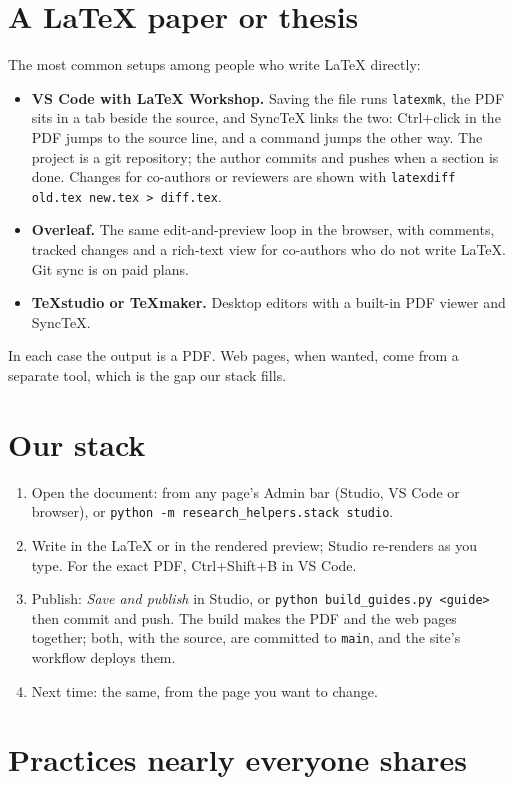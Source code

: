 \section{A LaTeX paper or thesis}

The most common setups among people who write LaTeX directly:
\begin{itemize}
\item \textbf{VS Code with LaTeX Workshop.} Saving the file runs \texttt{latexmk}, the PDF sits in a tab beside the source, and SyncTeX links the two: Ctrl+click in the PDF jumps to the source line, and a command jumps the other way. The project is a git repository; the author commits and pushes when a section is done. Changes for co-authors or reviewers are shown with \texttt{latexdiff old.tex new.tex > diff.tex}.
\item \textbf{Overleaf.} The same edit-and-preview loop in the browser, with comments, tracked changes and a rich-text view for co-authors who do not write LaTeX. Git sync is on paid plans.
\item \textbf{TeXstudio or TeXmaker.} Desktop editors with a built-in PDF viewer and SyncTeX.
\end{itemize}
In each case the output is a PDF. Web pages, when wanted, come from a separate tool, which is the gap our stack fills.

\section{Our stack}

\begin{enumerate}
\item Open the document: from any page's Admin bar (Studio, VS Code or browser), or \texttt{python -m research\_helpers.stack studio}.
\item Write in the LaTeX or in the rendered preview; Studio re-renders as you type. For the exact PDF, Ctrl+Shift+B in VS Code.
\item Publish: \emph{Save and publish} in Studio, or \texttt{python build\_guides.py <guide>} then commit and push. The build makes the PDF and the web pages together; both, with the source, are committed to \texttt{main}, and the site's workflow deploys them.
\item Next time: the same, from the page you want to change.
\end{enumerate}

\section{Practices nearly everyone shares}

